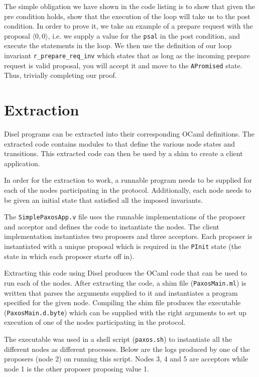 The simple obligation we have shown in the code listing is to show that
given the pre condition holds, show that the execution of the loop will take
us to the post condition.
In order to prove it, we take an example of a prepare request with the proposal
$\langle 0, 0 \rangle$, i.e. we supply a value for the \texttt{psal} in
the post condition, and execute the statements in the loop.
We then use the definition of our loop invariant
\texttt{r\_prepare\_req\_inv} which states that as long as the incoming prepare
request is valid proposal, you will accept it and move to the \texttt{APromised}
state. Thus, trivially completing our proof.

\section{Extraction}
Disel programs can be extracted into their corresponding OCaml definitions.
The extracted code contains modules to that define the various node states
and transitions. This extracted code can then be used by a shim to create a
client application.

In order for the extraction to work, a runnable program needs to be supplied for each of
the nodes participating in the protocol. Additionally, each node needs to
be given an initial state that satisfied all the imposed invariants.

The \texttt{SimplePaxosApp.v} file uses the runnable implementations of
the proposer and acceptor and defines the code to instantiate the nodes.
The client implementation instantiates two proposers and three acceptors.
Each proposer is instantiated with a unique proposal which is required in the
\texttt{PInit} state (the state in which each proposer starts off in).

Extracting this code using Disel produces the OCaml code
that can be used to run each of the nodes. After extracting the code,
a shim file (\texttt{PaxosMain.ml}) is written that parses the arguments
supplied to it and instantiates a program specified
for the given node. Compiling the shim file produces the executable (\texttt{PaxosMain.d.byte})
which can be supplied with the right arguments to set up execution of one
of the nodes participating in the protocol.

The executable was used in a shell script (\texttt{paxos.sh})
to instantiate all the different nodes as different processes.
Below are the logs produced by one of the
proposers (node 2) on running this script. Nodes 3, 4 and 5 are acceptors while
node 1 is the other proposer proposing value 1.

